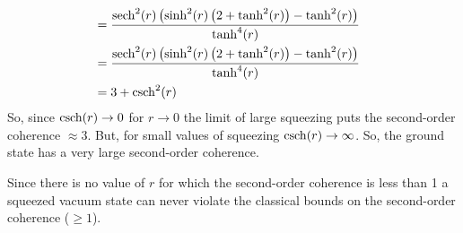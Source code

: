 \begin{homeworkProblem}
\begin{align}
{        }\\
        &= \frac{
        \operatorname{sech}^2(r)
        \left( \sinh^{2}(r)\left( 2+\tanh^2(r) \right) - \tanh^2(r)
        \right)
        }{\tanh^{4}(r)}
        \\
        &= \frac{
        \operatorname{sech}^2(r)
        \left( \sinh^{2}(r)\left( 2+\tanh^2(r) \right) - \tanh^2(r)
        \right)
        }{\tanh^{4}(r)} \\
        &= 3 + \operatorname{csch}^2(r)
        \\
    \end{align}
    So, since $ \operatorname{csch}(r) \to 0 $ for $ r \to 0 $ the limit of large squeezing
    puts the second-order coherence $ \approx 3 $. But, for small values of
    squeezing $ \operatorname{csch}(r) \to \infty $. So, the ground state has a very large
    second-order coherence.

    Since there is no value of $ r $ for which the second-order coherence is
    less than 1 a squeezed vacuum state can never violate the classical bounds
    on the second-order coherence ($ \ge 1 $).



\end{homeworkProblem}
